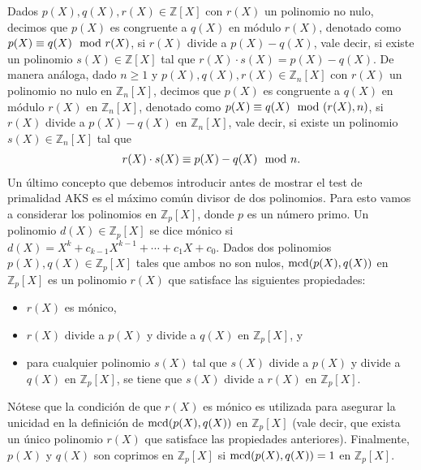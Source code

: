 Dados $p(X), q(X), r(X) \in \mathbb{Z}[X]$ con $r(X)$ un
polinomio no nulo, decimos que $p(X)$ es congruente a $q(X)$ en módulo
$r(X)$, denotado como $p(X) \equiv q(X) \mod r(X)$, si $r(X)$ divide
a $p(X) - q(X)$, vale decir, si existe un polinomio $s(X) \in
\mathbb{Z}[X]$ tal que $r(X) \cdot s(X) = p(X) - q(X)$. De manera
análoga, dado $n \geq 1$ y $p(X), q(X), r(X) \in \mathbb{Z}_n[X]$ con
$r(X)$ un polinomio no nulo en $\mathbb{Z}_n[X]$, decimos que $p(X)$
es congruente a $q(X)$ en módulo $r(X)$ en $\mathbb{Z}_n[X]$, denotado
como $p(X) \equiv q(X) \mod (r(X),n)$, si $r(X)$ divide a $p(X) -
q(X)$ en $\mathbb{Z}_n[X]$, vale decir, si existe un polinomio $s(X)
\in \mathbb{Z}_n[X]$ tal que
\begin{align*}
  r(X) \cdot s(X) \equiv p(X) - q(X) \mod n.
\end{align*}
Un último concepto que debemos introducir antes de mostrar el test de
primalidad AKS es el máximo común divisor de dos polinomios. Para esto
vamos a considerar los polinomios en $\mathbb{Z}_p[X]$, donde $p$ es
un número primo. Un polinomio $d(X) \in \mathbb{Z}_p[X]$ se dice
mónico si $d(X) = X^k + c_{k-1} X^{k-1} + \cdots + c_1 X + c_0$. Dados
dos polinomios $p(X), q(X) \in \mathbb{Z}_p[X]$ tales que ambos no son
nulos, ${\rm mcd}(p(X),q(X))$ en $\mathbb{Z}_p[X]$ es un polinomio $r(X)$
que satisface las siguientes propiedades:
\begin{itemize}
\item $r(X)$ es mónico,
  
\item $r(X)$ divide a $p(X)$ y divide a $q(X)$ en $\mathbb{Z}_p[X]$, y

\item para cualquier polinomio $s(X)$ tal que $s(X)$ divide a
  $p(X)$ y divide a $q(X)$ en $\mathbb{Z}_p[X]$, se tiene que $s(X)$
  divide a $r(X)$ en $\mathbb{Z}_p[X]$.
\end{itemize}
Nótese que la condición de que $r(X)$ es mónico es utilizada para
asegurar la unicidad en la definición de ${\rm mcd}(p(X),q(X))$ en
$\mathbb{Z}_p[X]$ (vale decir, que exista un único polinomio $r(X)$
que satisface las propiedades anteriores). Finalmente, $p(X)$ y $q(X)$
son coprimos en $\mathbb{Z}_p[X]$ si ${\rm mcd}(p(X),q(X)) = 1$ en
$\mathbb{Z}_p[X]$.

